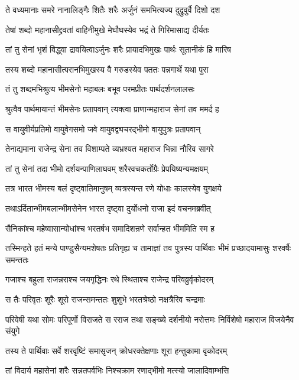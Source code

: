 \twolineshloka
{ते वध्यमानाः समरे नानालिङ्गैः शितैः शरैः}
{अर्जुनं समभित्यज्य दुद्रुवुर्वै दिशो दश}


\twolineshloka
{तेषां शब्दो महानासीद्द्रवतां वाहिनीमुखे}
{मेघौघस्येव भद्रं ते गिरिमासाद्य दीर्यतः}


\twolineshloka
{तां तु सेनां भृशं विद्ध्वा द्रावयित्वाऽर्जुनः शरैः}
{प्रायादभिमुखः पार्थः सूतानीकं हि मारिष}


\twolineshloka
{तस्य शब्दो महानासीत्परानभिमुखस्य वै}
{गरुडस्येव पततः पन्नगार्थे यथा पुरा}


\twolineshloka
{तं तु शब्दमभिश्रुत्य भीमसेनो महाबलः}
{बभूव परमप्रीतः पार्थदर्शनलालसः}


\twolineshloka
{श्रुत्वैव पार्थमायान्तं भीमसेनः प्रतापवान्}
{त्यक्त्वा प्राणान्महाराज सेनां तव ममर्द ह}


\twolineshloka
{स वायुवीर्यप्रतिमो वायुवेगसमो जवे}
{वायुवद्व्यचरद्भीमो वायुपुत्रः प्रतापवान्}


\twolineshloka
{तेनाद्यमाना राजेन्द्र सेना तव विशाम्पते}
{व्यभ्रश्यत महाराज भिन्ना नौरिव सागरे}


\twolineshloka
{तां तु सेनां तदा भीमो दर्शयन्पाणिलाघवम्}
{शरैरवचकर्तोग्रैः प्रेपयिष्यन्यमक्षयम्}


\twolineshloka
{तत्र भारत भीमस्य बलं दृष्ट्वातिमानुषम्}
{व्यत्रस्यन्त रणे योधाः कालस्येव युगक्षये}


\twolineshloka
{तथाऽर्दितान्भीमबलान्भीमसेनेन भारत}
{दृष्ट्वा दुर्योधनो राजा इदं वचनमब्रवीत्}


\twolineshloka
{सैनिकांश्च महेष्वासान्योधांश्च भरतर्षभ}
{समादिशन्रणे सर्वान्हत भीममिति स्म ह}


तस्मिन्हते हतं मन्ये पाण्डुसैन्यमशेषतः
\twolineshloka
{प्रतिगृह्य च तामाज्ञां तव पुत्रस्य पार्थिवाः}
{भीमं प्रच्छादयामासुः शरवर्षैः समन्ततः}


\twolineshloka
{गजाश्च बहुला राजन्नराश्च जयगृद्धिनः}
{रथे स्थिताश्च राजेन्द्र परिवव्रुर्वृकोदरम्}


\twolineshloka
{स तैः परिवृतः शूरैः शूरो राजन्समन्ततः}
{शुशुभे भरतश्रेष्ठो नक्षत्रैरिव चन्द्रमाः}


\threelineshloka
{परिवेषी यथा सोमः परिपूर्णो विराजते}
{स रराज तथा सङ्ख्ये दर्शनीयो नरोत्तमः}
{निर्विशेषो महाराज विजयेनैव संयुगे}


\twolineshloka
{तस्य ते पार्थिवाः सर्वे शरवृष्टिं समासृजन्}
{क्रोधरक्तेक्षणाः शूरा हन्तुकामा वृकोदरम्}


\twolineshloka
{तां विदार्य महासेनां शरैः सन्नतपर्वभिः}
{निश्चक्राम रणाद्भीमो मत्स्यो जालादिवाम्भसि}


